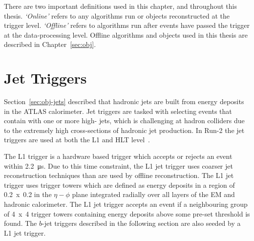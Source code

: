 There are two important definitions used in this chapter, and throughout this thesis.
\textit{`Online'} refers to any algorithms run or objects reconstructed at the trigger level.
\textit{`Offline'} refers to algorithms run after events have passed the trigger at the data-processing level.
Offline algorithms and objects used in this thesis are described in Chapter~\ref{sec:obj}.

\section{Jet Triggers}
\label{sec:trig-jet}

Section~\ref{sec:obj-jets} described that hadronic jets are built from energy deposits in the ATLAS calorimeter.
Jet triggers are tasked with selecting events that contain with one or more high-\pT{} jets,
which is challenging at hadron colliders due to the extremely high cross-sections of hadronic jet production.
In Run-2 the jet triggers are used at both the L1 and HLT level~\cite{trig-L1calo,trig-bTrig_desc,trig-run2_proc}.


The L1 trigger is a hardware based trigger which accepts or rejects an event within \SI{2.2}{\micro\second}.
Due to this time constraint, the L1 jet trigger uses coarser jet reconstruction techniques than are used by offline reconstruction.
The L1 jet trigger uses trigger towers which are defined as energy deposits in a region of 0.2~x~0.2 in the $\eta-\phi$ plane integrated radially over all layers of the EM and hadronic calorimeter.
The L1 jet trigger accepts an event if a neighbouring group of 4~x~4 trigger towers containing energy deposits above some pre-set threshold is found.
The $b$-jet triggers described in the following section are also seeded by a L1 jet trigger.


